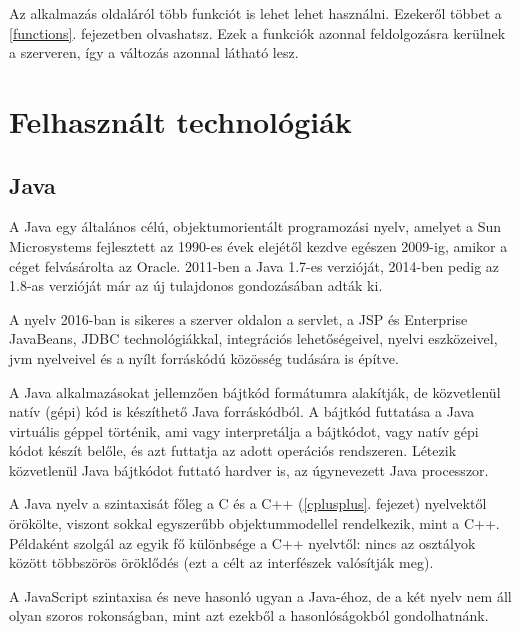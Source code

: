 \documentclass[a4paper,12pt]{report}
\begin{document}
\vspace{2mm}
Az alkalmazás oldaláról több funkciót is lehet lehet használni. Ezekeről többet a \ref{functions}. fejezetben olvashatsz. Ezek a funkciók azonnal feldolgozásra kerülnek a szerveren, így a változás azonnal látható lesz.

\newpage
\chapter{Felhasznált technológiák}
\label{technologies}

\section{Java}
\label{java}

A Java egy általános célú, objektumorientált programozási nyelv, amelyet a Sun Microsystems fejlesztett az 1990-es évek elejétől kezdve egészen 2009-ig, amikor a céget felvásárolta az Oracle. 2011-ben a Java 1.7-es verzióját, 2014-ben pedig az 1.8-as verzióját már az új tulajdonos gondozásában adták ki.



\vspace{2mm}
A nyelv 2016-ban is sikeres a szerver oldalon a servlet, a JSP és Enterprise JavaBeans, JDBC technológiákkal, integrációs lehetőségeivel, nyelvi eszközeivel, jvm nyelveivel és a nyílt forráskódú közösség tudására is építve.

\vspace{2mm}
A Java alkalmazásokat jellemzően bájtkód formátumra alakítják, de közvetlenül natív (gépi) kód is készíthető Java forráskódból. A bájtkód futtatása a Java virtuális géppel történik, ami vagy interpretálja a bájtkódot, vagy natív gépi kódot készít belőle, és azt futtatja az adott operációs rendszeren. Létezik közvetlenül Java bájtkódot futtató hardver is, az úgynevezett Java processzor.

\vspace{2mm}
A Java nyelv a szintaxisát főleg a C és a C++ (\ref{cplusplus}. fejezet) nyelvektől örökölte, viszont sokkal egyszerűbb objektummodellel rendelkezik, mint a C++. Példaként szolgál az egyik fő különbsége a C++ nyelvtől: nincs az osztályok között többszörös öröklődés (ezt a célt az interfészek valósítják meg). 

\vspace{2mm}
A JavaScript szintaxisa és neve hasonló ugyan a Java-éhoz, de a két nyelv nem áll olyan szoros rokonságban, mint azt ezekből a hasonlóságokból gondolhatnánk.
\end{document}
